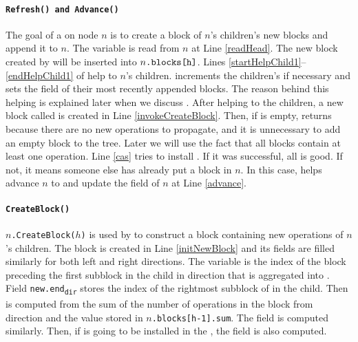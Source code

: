 \paragraph{\tt{Refresh()} and \tt{Advance()}}
The goal of a  on node $n$ is to create a block of $n$'s
children's new blocks and append it to $n$. The variable
 is read from $n$ at Line \ref{readHead}. The new
block created by  will be inserted into
$n{\normalfont{\texttt{.blocks[h]}}}$. Lines \ref{startHelpChild1}--\ref{endHelpChild1}
of  help to  $n$'s children. 
increments the children's  if necessary and sets the
 field of their most recently appended blocks. The reason
behind this helping is explained later when we discuss
. After helping to  the children, a new
block called  is created in Line
\ref{invokeCreateBlock}. Then, if  is empty, 
returns  because there are no new operations to propagate,
and it is unnecessary to add an empty block to the tree. Later we will
use the fact that all blocks contain at least one operation. Line
\ref{cas} tries to install . If it was successful, all is
good. If not, it means someone else has already put a block in
$n$. In this case,  helps advance
$n$ to  and update the  field of
$n$ at Line \ref{advance}. 


\paragraph{\tt{CreateBlock()}} \texttt{$n$.CreateBlock($h$)} is used
by  to construct a block containing new operations of
$n$'s children. 
The block  is created in Line \ref{initNewBlock} and its
fields are filled similarly for both left and right directions. The
variable   is the index of the block preceding the
first subblock in the child in direction  that is aggregated
into . Field \texttt{new.end\textsubscript{dir}} stores the
index of the rightmost subblock of  in the child. Then
 is computed from the sum of the number of
 operations in the  block from direction 
and the value stored in \texttt{$n$.blocks[h-1].sum}. The
field  is computed similarly. Then, if 
is going to be installed in the , the  field is also
computed. 

